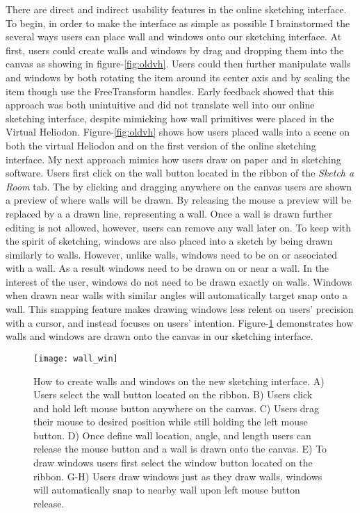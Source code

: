 		There are direct and indirect usability features in the online sketching interface.
		To begin, in order to make the interface as simple as possible I brainstormed the several ways users can place wall and windows onto our sketching interface.
		At first, users could create walls and windows by drag and dropping them into the canvas as showing in figure-\ref{fig:oldvh}.
		Users could then further manipulate walls and windows by both rotating the item around its center axis and by scaling the item though use the FreeTransform handles. 
		Early feedback showed that this approach was both unintuitive and did not translate well into our online sketching interface, despite mimicking how wall primitives were placed in the Virtual Heliodon.
		Figure-\ref{fig:oldvh} shows how users placed walls into a scene on both the virtual Heliodon and on the first version of the online sketching interface.
		My next approach mimics how users draw on paper and in sketching software.
		Users first click on the wall button located in the ribbon of the \textit{Sketch a Room} tab.
		The by clicking and dragging anywhere on the canvas users are shown a preview of where walls will be drawn.
		By releasing the mouse a preview will be replaced by a a drawn line, representing a wall.
		Once a wall is drawn further editing is not allowed, however, users can remove any wall later on.
		To keep with the spirit of sketching, windows are also placed into a sketch by being drawn similarly to walls.
		However, unlike walls, windows need to be on or associated with a wall.
		As a result windows need to be drawn on or near a wall.
		In the interest of the user, windows do not need to be drawn exactly on walls.
		Windows when drawn near walls with similar angles will automatically target snap onto a wall.
		This snapping feature makes drawing windows less relent on users' precision with a cursor, and instead focuses on users' intention.
		Figure-\ref{fig:wall_win} demonstrates how walls and windows are drawn onto the canvas in our sketching interface.

		\begin{figure}[t]
		\centering
		\texttt{[image: wall\_win]}
		\caption{How to create walls and windows on the new sketching interface. A) Users select the wall button located on the ribbon. B) Users click and hold left mouse button anywhere on the canvas. C) Users drag their mouse to desired position while still holding the left mouse button. D) Once define wall location, angle, and length users can release the mouse button and a wall is drawn onto the canvas. E) To draw  windows users first select the window button located on the ribbon. G-H) Users draw windows just as they draw walls, windows will automatically snap to nearby wall upon left mouse button release. }
		\label{fig:wall_win}
		\end{figure}

